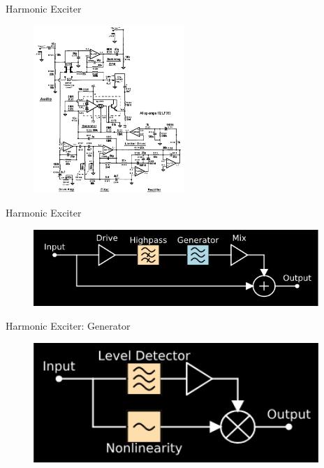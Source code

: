 \begin{frame}{Harmonic Exciter}
    \begin{figure}
        \centering
        \includegraphics[height=2.5in]{Figures/exciter_circuit.png}
    \end{figure}
\end{frame}

\begin{frame}{Harmonic Exciter}
    \begin{figure}
        \centering
        \includegraphics[width=4.25in]{../Exciter/Pics/Exciter_FullArch.png}
    \end{figure}
\end{frame}

\begin{frame}{Harmonic Exciter: Generator}
    \begin{figure}
        \centering
        \includegraphics[width=4.25in]{../Exciter/Pics/Exciter_Arch.png}
    \end{figure}
\end{frame}

